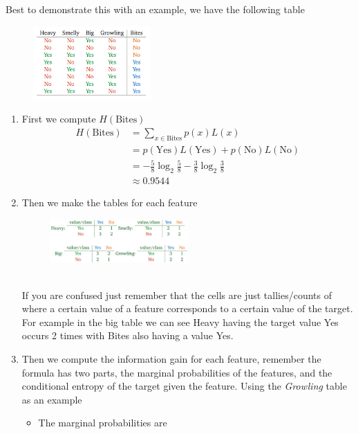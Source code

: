 \documentclass[12pt]{article}
\begin{document}
Best to demonstrate this with an example, we have the following table 
\begin{figure}[!h]
    \centering
    \includegraphics[width=0.4\textwidth]{assets/dt1.png}
\end{figure}
\begin{enumerate}
    \item First we compute $H(\text{Bites})$
    \begin{align*}
        H(\text{Bites}) &= \sum_{x\in \text{Bites}}p(x)L(x) \\
                        &= p(\text{Yes})L(\text{Yes}) + p(\text{No})L(\text{No}) \\
                        &= -\frac{5}{8}\log_2\frac{5}{8} - \frac{3}{8}\log_2\frac{3}{8} \\
                        &\approx 0.9544
    \end{align*}
    \item Then we make the tables for each feature 
    \begin{figure}[!h]
        \centering
        \includegraphics[width=0.5\textwidth]{assets/dt2.png}
    \end{figure}\\
    If you are confused just remember that the cells are just tallies/counts of where a certain value of a feature corresponds to a certain value of the target. For example in the big table we can see Heavy having the target value Yes occurs 2 times with Bites also having a value Yes.
    \item Then we compute the information gain for each feature, remember the formula has two parts, the marginal probabilities of the features, and the conditional entropy of the target given the feature. Using the \textit{Growling} table as an example 
    \begin{itemize}
        \item The marginal probabilities are 
        \[
\]
\end{itemize}
\end{enumerate}
\end{document}
